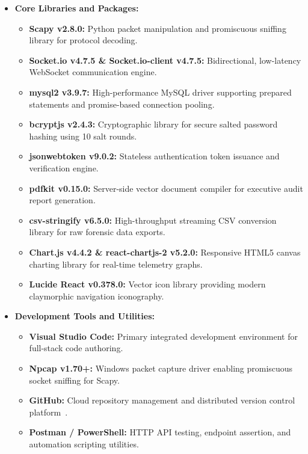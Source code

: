 \documentclass[a4paper,12pt]{report}
\begin{document}
\begin{itemize}
		\item \textbf{Core Libraries and Packages:}
		\begin{itemize}
			\item \textbf{Scapy v2.8.0:} Python packet manipulation and promiscuous sniffing library for protocol decoding.
			\item \textbf{Socket.io v4.7.5 \& Socket.io-client v4.7.5:} Bidirectional, low-latency WebSocket communication engine.
			\item \textbf{mysql2 v3.9.7:} High-performance MySQL driver supporting prepared statements and promise-based connection pooling.
			\item \textbf{bcryptjs v2.4.3:} Cryptographic library for secure salted password hashing using 10 salt rounds.
			\item \textbf{jsonwebtoken v9.0.2:} Stateless authentication token issuance and verification engine.
			\item \textbf{pdfkit v0.15.0:} Server-side vector document compiler for executive audit report generation.
			\item \textbf{csv-stringify v6.5.0:} High-throughput streaming CSV conversion library for raw forensic data exports.
			\item \textbf{Chart.js v4.4.2 \& react-chartjs-2 v5.2.0:} Responsive HTML5 canvas charting library for real-time telemetry graphs.
			\item \textbf{Lucide React v0.378.0:} Vector icon library providing modern claymorphic navigation iconography.
		\end{itemize}
		
		\item \textbf{Development Tools and Utilities:}
		\begin{itemize}
			\item \textbf{Visual Studio Code:} Primary integrated development environment for full-stack code authoring.
			\item \textbf{Npcap v1.70+:} Windows packet capture driver enabling promiscuous socket sniffing for Scapy.
			\item \textbf{GitHub:} Cloud repository management and distributed version control platform~\cite{six}.
			\item \textbf{Postman / PowerShell:} HTTP API testing, endpoint assertion, and automation scripting utilities.
		\end{itemize}
	\end{itemize}
	
\end{document}
